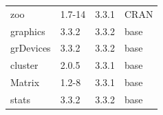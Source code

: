 \begin{longtable}{llll}
\rowcolor{black!5}
zoo          & 1.7-14         & 3.3.1 & \gls{CRAN}            \\
\rowcolor{black!10}
graphics     & 3.3.2          & 3.3.2 & base            \\
\rowcolor{black!5}
grDevices    & 3.3.2          & 3.3.2 & base            \\
\rowcolor{black!10}
cluster      & 2.0.5          & 3.3.1 & base            \\
\rowcolor{black!5}
Matrix       & 1.2-8          & 3.3.1 & base            \\
\rowcolor{black!10}
stats        & 3.3.2          & 3.3.2 & base            \\
\hline
\end{longtable}

